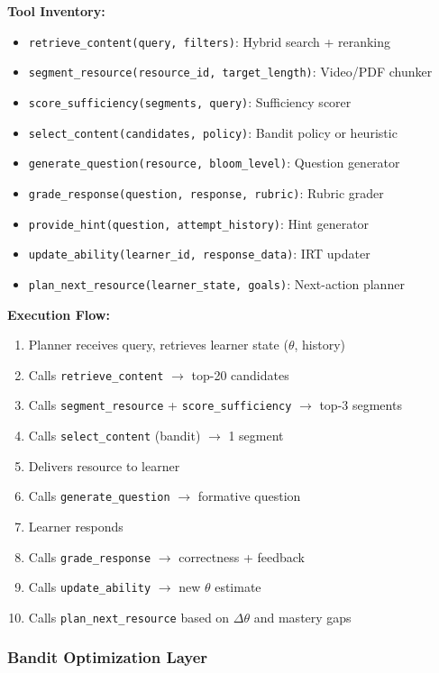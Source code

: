 \documentclass[11pt,letterpaper]{article}
\begin{document}
\textbf{Tool Inventory:}
\begin{itemize}
\item \texttt{retrieve\_content(query, filters)}: Hybrid search + reranking
\item \texttt{segment\_resource(resource\_id, target\_length)}: Video/PDF chunker
\item \texttt{score\_sufficiency(segments, query)}: Sufficiency scorer
\item \texttt{select\_content(candidates, policy)}: Bandit policy or heuristic
\item \texttt{generate\_question(resource, bloom\_level)}: Question generator
\item \texttt{grade\_response(question, response, rubric)}: Rubric grader
\item \texttt{provide\_hint(question, attempt\_history)}: Hint generator
\item \texttt{update\_ability(learner\_id, response\_data)}: IRT updater
\item \texttt{plan\_next\_resource(learner\_state, goals)}: Next-action planner
\end{itemize}

\textbf{Execution Flow:}
\begin{enumerate}
\item Planner receives query, retrieves learner state ($\theta$, history)
\item Calls \texttt{retrieve\_content} $\rightarrow$ top-20 candidates
\item Calls \texttt{segment\_resource} + \texttt{score\_sufficiency} $\rightarrow$ top-3 segments
\item Calls \texttt{select\_content} (bandit) $\rightarrow$ 1 segment
\item Delivers resource to learner
\item Calls \texttt{generate\_question} $\rightarrow$ formative question
\item Learner responds
\item Calls \texttt{grade\_response} $\rightarrow$ correctness + feedback
\item Calls \texttt{update\_ability} $\rightarrow$ new $\theta$ estimate
\item Calls \texttt{plan\_next\_resource} based on $\Delta\theta$ and mastery gaps
\end{enumerate}

\subsubsection{Bandit Optimization Layer}
\end{document}
